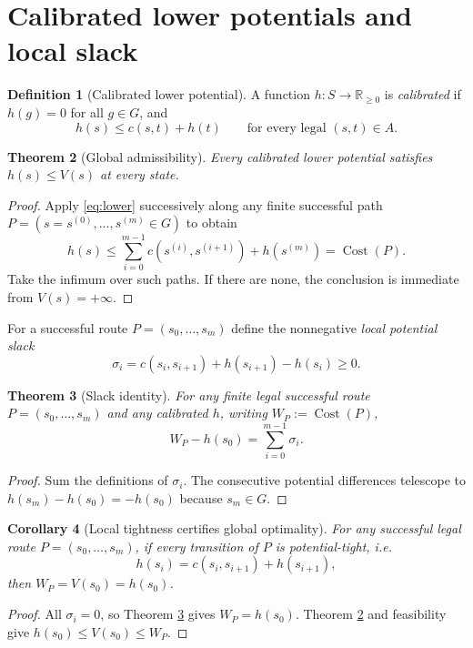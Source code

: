\documentclass[11pt,letterpaper]{article}
\newtheorem{theorem}{Theorem}[section]
\newtheorem{corollary}[theorem]{Corollary}
\theoremstyle{definition}\newtheorem{definition}[theorem]{Definition}\newtheorem{example}[theorem]{Example}
\theoremstyle{remark}\newtheorem{remark}[theorem]{Remark}
\newcommand{\RR}{\mathbb R}
\newcommand{\Costs}{\operatorname{Cost}}
\begin{document}
\section{Calibrated lower potentials and local slack}
\begin{definition}[Calibrated lower potential]
A function $h:S\to\RR_{\ge0}$ is \emph{calibrated} if $h(g)=0$ for all $g\in G$, and
\begin{equation}\label{eq:lower}
 h(s)\le c(s,t)+h(t)\qquad\text{for every legal }(s,t)\in A.
\end{equation}
\end{definition}
\begin{theorem}[Global admissibility]\label{thm:lower}
Every calibrated lower potential satisfies $h(s)\le V(s)$ at every state.
\end{theorem}
\begin{proof}
Apply \eqref{eq:lower} successively along any finite successful path $P=(s=s^{(0)},\ldots,s^{(m)}\in G)$ to obtain
\[
 h(s)\le\sum_{i=0}^{m-1}c(s^{(i)},s^{(i+1)})+h(s^{(m)})=\Costs(P).
\]
Take the infimum over such paths. If there are none, the conclusion is immediate from $V(s)=+\infty$.
\end{proof}
For a successful route $P=(s_0,\ldots,s_m)$ define the nonnegative \emph{local potential slack}
\[
\sigma_i=c(s_i,s_{i+1})+h(s_{i+1})-h(s_i)\ge0.
\]
\begin{theorem}[Slack identity]\label{thm:slack}
For any finite legal successful route $P=(s_0,\ldots,s_m)$ and any calibrated $h$, writing $W_P:=\Costs(P)$,
\begin{equation}\label{eq:slack}
\boxed{W_P-h(s_0)=\sum_{i=0}^{m-1}\sigma_i.}
\end{equation}
\end{theorem}
\begin{proof}
Sum the definitions of $\sigma_i$. The consecutive potential differences telescope to $h(s_m)-h(s_0)=-h(s_0)$ because $s_m\in G$.
\end{proof}
\begin{corollary}[Local tightness certifies global optimality]\label{cor:tight}
For any successful legal route $P=(s_0,\ldots,s_m)$, if every transition of $P$ is potential-tight, i.e.
\[
 h(s_i)=c(s_i,s_{i+1})+h(s_{i+1}),
\]
then $W_P=V(s_0)=h(s_0)$.
\end{corollary}
\begin{proof}
All $\sigma_i=0$, so Theorem \ref{thm:slack} gives $W_P=h(s_0)$. Theorem \ref{thm:lower} and feasibility give $h(s_0)\le V(s_0)\le W_P$.
\end{proof}
\end{document}
